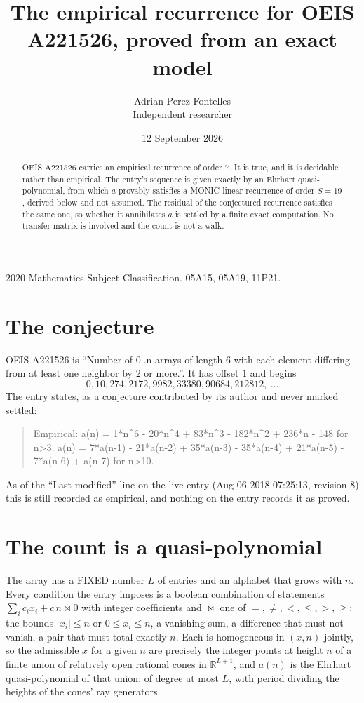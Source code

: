 \documentclass[11pt,a4paper]{article}
\title{The empirical recurrence for OEIS A221526, proved from an exact model}
\author{Adrian Perez Fontelles\\ \small Independent researcher}
\date{12 September 2026}
\theoremstyle{plain}
\theoremstyle{definition}
\begin{document}
\maketitle

\begin{abstract}
OEIS A221526 carries an empirical recurrence of order $7$. It is true, and it is
decidable rather than empirical. The entry's sequence is given exactly by an Ehrhart quasi-polynomial, from
which $a$ provably satisfies a MONIC linear recurrence of order $S=19$, derived below and not
assumed. The residual of the conjectured recurrence satisfies the same one, so whether it
annihilates $a$ is settled by a finite exact computation. No transfer matrix is involved and
the count is not a walk.
\end{abstract}

\noindent\small 2020 Mathematics Subject Classification. 05A15, 05A19, 11P21.\normalsize

\section{The conjecture}

OEIS A221526 is ``Number of 0..n arrays of length 6 with each element differing from at least one neighbor by 2 or more.''. It has offset $1$ and begins
\[
0, 10, 274, 2172, 9982, 33380, 90684, 212812,\ \dots
\]
The entry states, as a conjecture contributed by its author and never marked settled:
\begin{quote}
Empirical: a(n) = 1*n\^{}6 - 20*n\^{}4 + 83*n\^{}3 - 182*n\^{}2 + 236*n - 148 for n>3. a(n) = 7*a(n-1) - 21*a(n-2) + 35*a(n-3) - 35*a(n-4) + 21*a(n-5) - 7*a(n-6) + a(n-7) for n>10.
\end{quote}
As of the ``Last modified'' line on the live entry (Aug 06 2018 07:25:13, revision 8)
this is still recorded as empirical, and nothing on the entry records it as proved.

\section{The count is a quasi-polynomial}

The array has a FIXED number $L$ of entries and an alphabet that grows with $n$. Every
condition the entry imposes is a boolean combination of statements
$\sum_i c_ix_i + c\,n \bowtie 0$ with integer coefficients and $\bowtie$ one of
$=,\ne,<,\le,>,\ge$: the bounds $|x_i|\le n$ or $0\le x_i\le n$, a vanishing sum, a difference
that must not vanish, a pair that must total exactly $n$. Each is homogeneous in $(x,n)$
jointly, so the admissible $x$ for a given $n$ are precisely the integer points at height $n$
of a finite union of relatively open rational cones in $\mathbb{R}^{L+1}$, and $a(n)$ is
the Ehrhart quasi-polynomial of that union: of degree at most $L$, with period dividing the
heights of the cones' ray generators.
\end{document}
